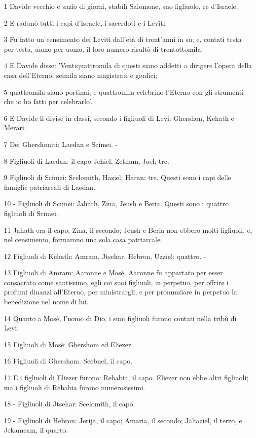 \par 1 Davide vecchio e sazio di giorni, stabilì Salomone, suo figliuolo, re d'Israele.
\par 2 E radunò tutti i capi d'Israele, i sacerdoti e i Leviti.
\par 3 Fu fatto un censimento dei Leviti dall'età di trent'anni in su; e, contati testa per testa, uomo per uomo, il loro numero risultò di trentottomila.
\par 4 E Davide disse: 'Ventiquattromila di questi siano addetti a dirigere l'opera della casa dell'Eterno; seimila siano magistrati e giudici;
\par 5 quattromila siano portinai, e quattromila celebrino l'Eterno con gli strumenti che io ho fatti per celebrarlo'.
\par 6 E Davide li divise in classi, secondo i figliuoli di Levi: Ghershon, Kehath e Merari.
\par 7 Dei Ghershoniti: Laedan e Scimei. -
\par 8 Figliuoli di Laedan: il capo Jehiel, Zetham, Joel; tre. -
\par 9 Figliuoli di Scimei: Scelomith, Haziel, Haran; tre. Questi sono i capi delle famiglie patriarcali di Laedan.
\par 10 - Figliuoli di Scimei: Jahath, Zina, Jeush e Beria. Questi sono i quattro figliuoli di Scimei.
\par 11 Jahath era il capo; Zina, il secondo; Jeush e Beria non ebbero molti figliuoli, e, nel censimento, formarono una sola casa patriarcale.
\par 12 Figliuoli di Kehath: Amram, Jtsehar, Hebron, Uzziel; quattro. -
\par 13 Figliuoli di Amram: Aaronne e Mosè. Aaronne fu appartato per esser consacrato come santissimo, egli coi suoi figliuoli, in perpetuo, per offrire i profumi dinanzi all'Eterno, per ministrargli, e per pronunziare in perpetuo la benedizione nel nome di lui.
\par 14 Quanto a Mosè, l'uomo di Dio, i suoi figliuoli furono contati nella tribù di Levi.
\par 15 Figliuoli di Mosè: Ghershom ed Eliezer.
\par 16 Figliuoli di Ghershom: Scebuel, il capo.
\par 17 E i figliuoli di Eliezer furono: Rehabia, il capo. Eliezer non ebbe altri figliuoli; ma i figliuoli di Rehabia furono numerosissimi.
\par 18 - Figliuoli di Jtsehar: Scelomith, il capo.
\par 19 - Figliuoli di Hebron: Jerija, il capo; Amaria, il secondo; Jahaziel, il terzo, e Jekameam, il quarto.
